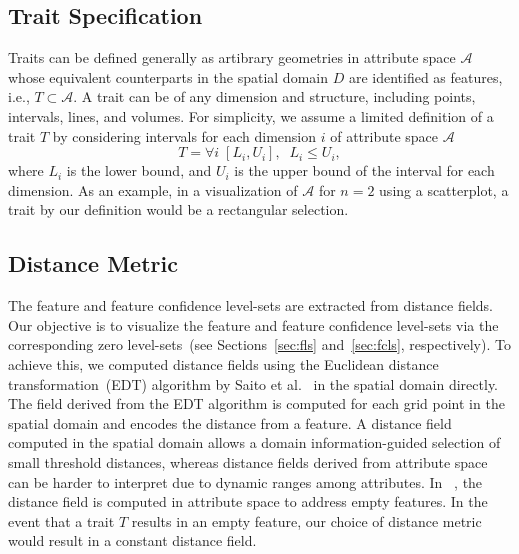 \subsection{Trait Specification}
Traits can be defined generally as artibrary geometries in attribute space $\mathcal{A}$ whose equivalent counterparts in the spatial domain $D$ are identified as features, i.e., $T\subset\mathcal{A}$.
%
A trait can be of any dimension and structure, including points, intervals, lines, and volumes.
%
%
For simplicity, we assume a limited definition of a trait $T$ by considering intervals for each dimension $i$ of attribute space $\mathcal{A}$
%
\begin{equation}	
T = \forall{i}\;[L_{i}, U_{i}], \;\;L_{i} \leqslant U_{i}, 
\end{equation}
where $L_{i}$ is the lower bound, and $U_{i}$ is the upper bound of the interval for each dimension.
%
As an example, in a visualization of $\mathcal{A}$ for $n = 2$ using a scatterplot, a trait by our definition would be a rectangular selection.

\vspace{-1mm}
\subsection{Distance Metric}
%

The feature and feature confidence level-sets are extracted from distance fields.
%
Our objective is to visualize the feature and feature confidence level-sets via the corresponding zero level-sets~(see Sections~\ref{sec:fls} and~\ref{sec:fcls}, respectively). 
%
To achieve this, we computed distance fields using the Euclidean distance transformation~(EDT) algorithm by Saito et al.~\cite{saito1994new} in the spatial domain directly.
%
The field derived from the EDT algorithm is computed for each grid point in the spatial domain and encodes the distance from a feature.
%
A distance field computed in the spatial domain allows a domain information-guided selection of small threshold distances, whereas distance fields derived from attribute space can be harder to interpret due to dynamic ranges among attributes.
%
In ~\cite{jankowai2020feature}, the distance field is computed in attribute space to address empty features.
%
In the event that a trait $T$ results in an empty feature, our choice of distance metric would result in a constant distance field.
%

